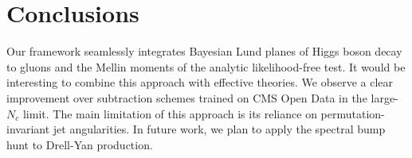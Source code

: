 \section{Conclusions}\label{sec:conclusions}

Our framework seamlessly integrates Bayesian Lund planes of Higgs boson
decay to gluons and the Mellin moments of the analytic likelihood-free
test. It would be interesting to combine this approach with effective
theories. We observe a clear improvement over subtraction schemes
trained on CMS Open Data in the large-$N_c$ limit. The main limitation
of this approach is its reliance on permutation-invariant jet
angularities. In future work, we plan to apply the spectral bump hunt to
Drell-Yan production.

